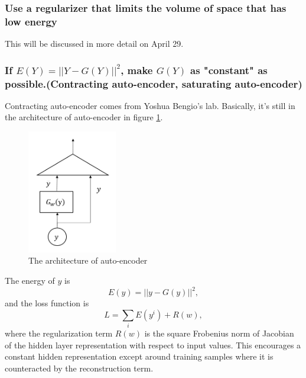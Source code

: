 \subsubsection{Use a regularizer that limits the volume of space that has low energy}
This will be discussed in more detail on April 29.
    
\subsubsection{If $E(Y) = ||Y - G(Y)||^2$, make $G(Y)$ as "constant" as possible.(Contracting auto-encoder, saturating auto-encoder)}

Contracting auto-encoder comes from Yoshua Bengio's lab. Basically, it's still in the architecture of auto-encoder in figure  \ref{figure5}.

\begin{figure}[htb]
    \centering
    \includegraphics[width=0.35\textwidth]{lectures/10-b/image/PIC5.PNG}
    \caption{The architecture of auto-encoder}
    \label{figure5}
\end{figure}

The energy of $y$ is $$ E(y) = ||y-G(y)||^2, $$ and the loss function is $$L = \sum_i E(y^i)+R(w),$$ where the regularization term $R(w)$ is the square Frobenius norm of Jacobian of the hidden layer representation with respect to input values. 
This encourages a constant hidden representation except around training samples where it is counteracted by the reconstruction term.